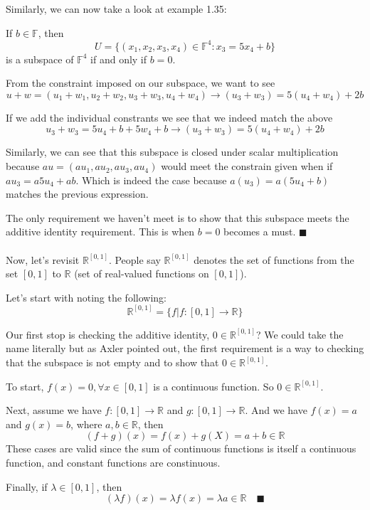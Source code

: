 Similarly, we can now take a look at example 1.35:

If $b\in \mathbb{F}$, then
$$
U = \{ (x_1, x_2, x_3, x_4) \in \mathbb{F}^4 : x_3 = 5x_4 + b \}
$$
is a subspace of $\mathbb{F}^4$ if and only if $b=0$.

From the constraint imposed on our subspace, we want to see
$$
u + w = (u_1+w_1, u_2+w_2, u_3+w_3, u_4+w_4) \rightarrow (u_3+w_3) = 5(u_4+w_4) + 2b
$$

If we add the individual constrants we see that we indeed match the above
$$
u_3 + w_3 = 5u_4 + b + 5w_4 + b \rightarrow (u_3+w_3) = 5(u_4+w_4) + 2b
$$

Similarly, we can see that this subspace is closed under scalar multiplication
because $au = (au_1, au_2, au_3, au_4)$ would meet the constrain given when if
$au_3 = a5u_4 + ab$.
Which is indeed the case because $a(u_3) = a(5u_4 + b)$ matches the previous expression.

The only requirement we haven't meet is to show that this subspace meets the additive identity requirement.
This is when $b=0$ becomes a must.
$\blacksquare$
\\~\\

Now, let's revisit $\mathbb{R}^{[0,1]}$. People say $\mathbb{R}^{[0,1]}$ denotes the set of functions
from the set $[0,1]$ to $\mathbb{R}$ (set of real-valued functions on $[0,1]$).

Let's start with noting the following:
$$
\mathbb{R}^{[0,1]} = \{ f | f : [0,1] \rightarrow \mathbb{R}\}
$$

Our first stop is checking the additive identity, $0\in\mathbb{R}^{[0,1]}$?
We could take the name literally but as Axler pointed out, the first requirement is a way to checking
that the subspace is not empty and to show that $0\in \mathbb{R}^{[0,1]}$.

To start, $f(x) = 0, \forall x\in [0,1]$ is a continuous function.
So $0\in\mathbb{R}^{[0,1]}$.

Next, assume we have $f : [0,1]\rightarrow \mathbb{R}$ and $g : [0,1]\rightarrow \mathbb{R}$.
And we have $f(x) = a$ and $g(x) = b$, where $a,b\in\mathbb{R}$, then
$$
(f+g)(x) = f(x) + g(X) = a + b \in \mathbb{R}
$$
These cases are valid since the sum of continuous functions is itself a continuous function,
and constant functions are constinuous.

Finally, if $\lambda \in [0,1]$, then
$$
( \lambda f )(x) = \lambda f(x) = \lambda a \in \mathbb{R} \quad \blacksquare
$$
\\~\\